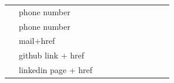 \documentclass[10pt]{article} %
\begin{document}
\begin{paracol}{2}
\medskip %


\switchcolumn %


\parbox[top][0.12\textheight][c]{\linewidth}{ %
	\vspace{-0.04\textheight} %
	\colorbox{shade}{ %
		\begin{supertabular}{p{0.05\linewidth}|p{0.775\linewidth}} %
			\raisebox{-1pt}{\faPhone} & phone number \\ %
			\raisebox{-1pt}{\faWechat} & phone number \\
			\raisebox{0pt}{\small\faEnvelope} & mail+href \\ %
			\raisebox{-1pt}{\faGithub} & github link + href \\ %
			\raisebox{-1pt}{\faLinkedinSquare} & linkedin page + href \\ %
		\end{supertabular}
	}
}






\end{paracol}
\end{document}
